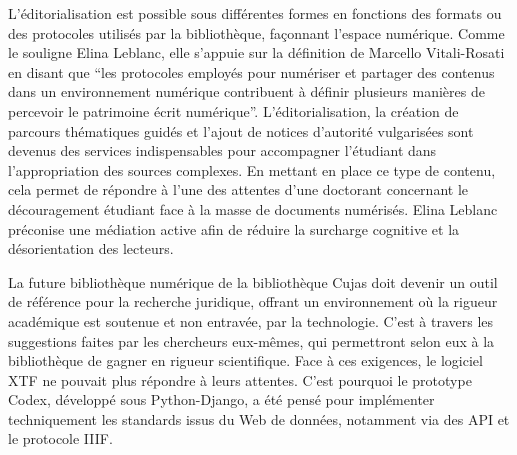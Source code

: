 L'éditorialisation est possible sous différentes formes en fonctions des formats ou des protocoles utilisés par la bibliothèque, façonnant l'espace numérique. Comme le souligne Elina Leblanc, elle s'appuie sur la définition de Marcello Vitali-Rosati en disant que \enquote{les protocoles employés pour numériser et partager des contenus dans un environnement numérique contribuent à définir plusieurs manières de percevoir le patrimoine  écrit numérique}. L'éditorialisation, la création de parcours thématiques guidés et l'ajout de notices d'autorité vulgarisées sont devenus des services indispensables pour accompagner l'étudiant dans l'appropriation des sources complexes. En mettant en place ce type de contenu, cela permet de répondre à l'une des attentes d'une doctorant concernant le découragement étudiant face à la masse de documents numérisés. Elina Leblanc préconise une médiation active afin de réduire la surcharge cognitive et la désorientation des lecteurs.
\bigskip

La future bibliothèque numérique de la bibliothèque Cujas doit devenir un outil de référence pour la recherche juridique, offrant un environnement où la rigueur académique est soutenue et non entravée, par la technologie. C'est à travers les suggestions faites par les chercheurs eux-mêmes, qui permettront selon eux à la bibliothèque de gagner en rigueur scientifique. Face à ces exigences, le logiciel XTF ne pouvait plus répondre à leurs attentes. C'est pourquoi le prototype Codex, développé sous Python-Django, a été pensé pour implémenter techniquement les standards issus du Web de données, notamment via des API et le protocole IIIF.